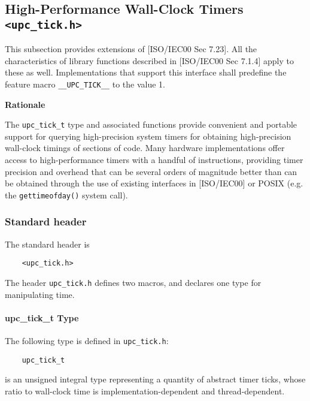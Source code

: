 \pagebreak %
\subsection{High-Performance Wall-Clock Timers {\tt <upc\_tick.h>}}
\label{upc-tick}

\npf This subsection provides extensions of [ISO/IEC00 Sec 7.23].
    All the characteristics of library functions described
    in [ISO/IEC00 Sec 7.1.4] apply to these as well.  Implementations
    that support this interface shall predefine the feature macro
    {\tt \_\_UPC\_TICK\_\_} to the value 1.

{\bf Rationale}

\np The {\tt upc\_tick\_t} type and associated functions 
provide convenient and portable support for
querying high-precision system timers for obtaining high-precision wall-clock timings of
sections of code. Many hardware implementations offer access to high-performance timers
with a handful of instructions, providing timer precision and overhead that can
be several orders of magnitude better than can be obtained through the use of
existing interfaces in [ISO/IEC00] or POSIX (e.g. the {\tt gettimeofday()} system call).


\subsubsection{Standard header}

\npf The standard header is

\begin{verbatim}
    <upc_tick.h> 
\end{verbatim}

\np The header {\tt upc\_tick.h} defines two macros, and declares one type for manipulating time.

\paragraph{upc\_tick\_t Type}

\npf The following type is defined in {\tt upc\_tick.h}:

\begin{verbatim}
    upc_tick_t 
\end{verbatim}

 is an unsigned integral type representing a quantity of abstract timer ticks,
whose ratio to wall-clock time is implementation-dependent and thread-dependent.

